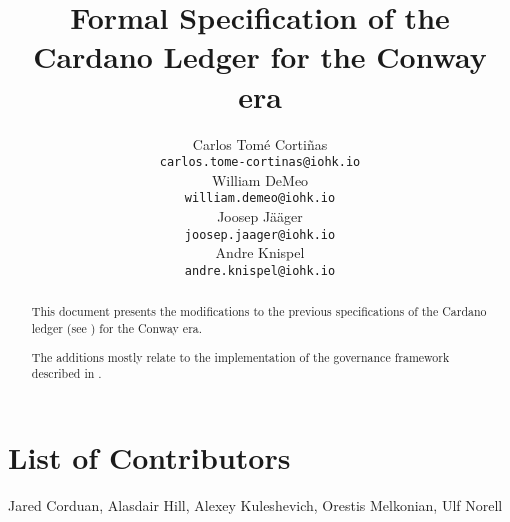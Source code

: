 \documentclass[11pt,a4paper,dvipsnames]{article}
\begin{document}
\title{Formal Specification of the Cardano Ledger for the Conway era}

\author{
   Carlos Tom\'{e} Corti\~{n}as \\ {\small \texttt{carlos.tome-cortinas@iohk.io}} \\
   William DeMeo                \\ {\small \texttt{william.demeo@iohk.io}} \\
   Joosep Jääger                \\ {\small \texttt{joosep.jaager@iohk.io}} \\
   Andre Knispel                \\ {\small \texttt{andre.knispel@iohk.io}} \\
   }

\date{}

\maketitle

\begin{abstract}
  This document presents the modifications to the previous
  specifications of the Cardano ledger (see
  \cite{cardano_shelley_spec,cardano_shelley_ma_spec,cardano_alonzo_spec,cardano_babbage_spec})
  for the Conway era.

  The additions mostly relate to the implementation of the governance
  framework described in \cite{cip1694}.
\end{abstract}

\section*{List of Contributors}
\label{acknowledgements}

Jared Corduan, Alasdair Hill, Alexey Kuleshevich, Orestis Melkonian, Ulf Norell

\tableofcontents
















\clearpage

\printbibliography

\clearpage

\appendix




\end{document}
